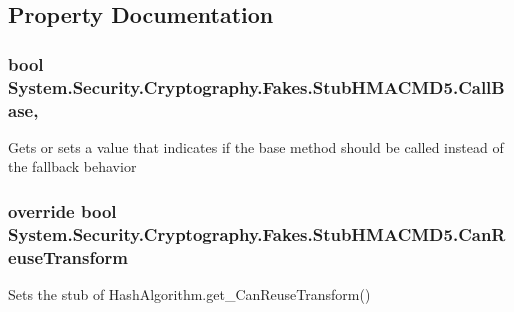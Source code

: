 \subsection{Property Documentation}
\hypertarget{class_system_1_1_security_1_1_cryptography_1_1_fakes_1_1_stub_h_m_a_c_m_d5_ab841ef827798a5d19d18c957d9fee827}{
\subsubsection[{Call\-Base}]{\setlength{\rightskip}{0pt plus 5cm}bool System.\-Security.\-Cryptography.\-Fakes.\-Stub\-H\-M\-A\-C\-M\-D5.\-Call\-Base\hspace{0.3cm}{\ttfamily [get]}, {\ttfamily [set]}}}\label{class_system_1_1_security_1_1_cryptography_1_1_fakes_1_1_stub_h_m_a_c_m_d5_ab841ef827798a5d19d18c957d9fee827}


Gets or sets a value that indicates if the base method should be called instead of the fallback behavior

\hypertarget{class_system_1_1_security_1_1_cryptography_1_1_fakes_1_1_stub_h_m_a_c_m_d5_a534dcffb8aed71f076f826ae5aea4b1e}{
\subsubsection[{Can\-Reuse\-Transform}]{\setlength{\rightskip}{0pt plus 5cm}override bool System.\-Security.\-Cryptography.\-Fakes.\-Stub\-H\-M\-A\-C\-M\-D5.\-Can\-Reuse\-Transform\hspace{0.3cm}{\ttfamily [get]}}}\label{class_system_1_1_security_1_1_cryptography_1_1_fakes_1_1_stub_h_m_a_c_m_d5_a534dcffb8aed71f076f826ae5aea4b1e}


Sets the stub of Hash\-Algorithm.\-get\-\_\-\-Can\-Reuse\-Transform()

